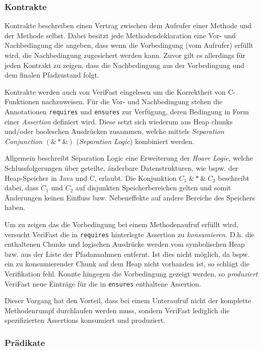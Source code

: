 \subsubsection{Kontrakte}

Kontrakte beschreiben einen Vertrag zwischen dem Aufrufer einer Methode und der Methode selbst. Dabei besitzt jede Methodendeklaration eine Vor- und Nachbedingung die angeben, dass wenn die Vorbedingung (vom Aufrufer) erfüllt wird, die Nachbedingung zugesichert werden kann. Zuvor gilt es allerdings für jeden Kontrakt zu zeigen, dass die Nachbedingung aus der Vorbedingung und dem finalen Pfadzustand folgt.

Kontrakte werden auch von VeriFast eingelesen um die Korrektheit von C-Funktionen nachzuweisen. Für die Vor- und Nachbedingung stehen die Annotationen \texttt{requires} und \texttt{ensures} zur Verfügung, deren Bedingung in Form einer \emph{Assertion} definiert wird. Diese setzt sich wiederum aus Heap chunks und/oder booleschen Ausdrücken zusammen, welche mittels \emph{Separation Conjunction} $(\&{*}\&)$ (\emph{Separation Logic}) kombiniert werden.

Allgemein beschreibt Separation Logic eine Erweiterung der \emph{Hoare Logic}, welche Schlussfolgerungen über geteilte, änderbare Datenstrukturen, wie bspw. der Heap-Speicher in Java und C, erlaubt. Die Konjunktion $C_{1} \; \&{*}\& \; C_{2}$ beschreibt dabei, dass $C_{1}$ und $C_{2}$ auf disjunkten Speicherbereichen gelten und somit Änderungen keinen Einfluss bzw. Nebeneffekte auf andere Bereiche des Speichers haben. \cite{Reynolds2002}

Um zu zeigen das die Vorbedingung bei einem Methodenaufruf erfüllt wird, versucht VeriFast die in \texttt{requires} hinterlegte Assertion zu \emph{konsumieren}. D.h. die enthaltenen Chunks und logischen Ausdrücke werden vom symbolischen Heap bzw. aus der Liste der Pfadannahmen entfernt. Ist dies nicht möglich, da bspw. ein zu konsumierender Chunk auf dem Heap nicht vorhanden ist, so schlägt die Verifikation fehl. Konnte hingegen die Vorbedingung gezeigt werden, so \emph{produziert} VeriFast neue Einträge für die in \texttt{ensures} enthaltene Assertion. \cite{Jacobs2017}

Dieser Vorgang hat den Vorteil, dass bei einem Unteraufruf nicht der komplette Methodenrumpf durchlaufen werden muss, sondern VeriFast lediglich die spezifizierten Assertions konsumiert und produziert.

\subsubsection{Prädikate}

